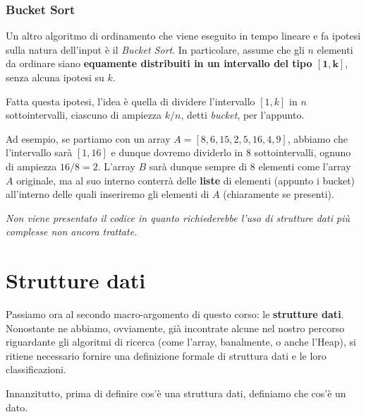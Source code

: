 \documentclass[12pt]{report}
\begin{document}
    \subsection{Bucket Sort}
    Un altro algoritmo di ordinamento che viene eseguito in tempo lineare e fa ipotesi sulla natura dell'input è il \textit{Bucket Sort}. In particolare, assume che gli $n$ elementi da ordinare siano \textbf{equamente distribuiti in un intervallo del tipo $\mathbf{[1, k]}$}, senza alcuna ipotesi su $k$.
    
    Fatta questa ipotesi, l'idea è quella di dividere l'intervallo $[1, k]$ in $n$ sottointervalli, ciascuno di ampiezza $k/n$, detti \textit{bucket}, per l'appunto.
    
    Ad esempio, se partiamo con un array $A = [8, 6, 15, 2, 5, 16, 4, 9]$, abbiamo che l'intervallo sarà $[1, 16]$ e dunque dovremo dividerlo in $8$ sottointervalli, ognuno di ampiezza $16/8 = 2$. L'array $B$ sarà dunque sempre di $8$ elementi come l'array $A$ originale, ma al suo interno conterrà delle \textbf{liste} di elementi (appunto i bucket) all'interno delle quali inseriremo gli elementi di $A$ (chiaramente se presenti). 
    
    \textit{Non viene presentato il codice in quanto richiederebbe l'uso di strutture dati più complesse non ancora trattate.}
    
    \chapter{Strutture dati}
    Passiamo ora al secondo macro-argomento di questo corso: le \textbf{strutture dati}.
    Nonostante ne abbiamo, ovviamente, già incontrate alcune nel nostro percorso riguardante gli algoritmi di ricerca (come l'array, banalmente, o anche l'Heap), si ritiene necessario fornire una definizione formale di struttura dati e le loro classificazioni.
    
    Innanzitutto, prima di definire cos'è una struttura dati, definiamo che cos'è un dato.
    
\end{document}
